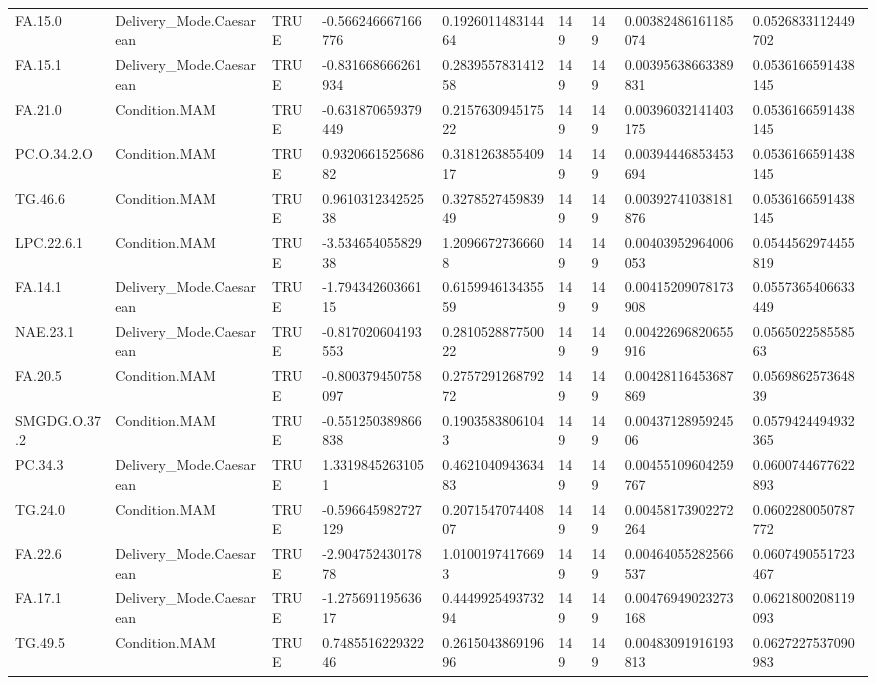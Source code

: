 \begin{longtable}{lllllllll}
FA.15.0 & Delivery\_Mode.Caesarean & TRUE & -0.566246667166776 & 0.192601148314464 & 149 & 149 & 0.00382486161185074 & 0.0526833112449702 \\
FA.15.1 & Delivery\_Mode.Caesarean & TRUE & -0.831668666261934 & 0.283955783141258 & 149 & 149 & 0.00395638663389831 & 0.0536166591438145 \\
FA.21.0 & Condition.MAM & TRUE & -0.631870659379449 & 0.215763094517522 & 149 & 149 & 0.00396032141403175 & 0.0536166591438145 \\
PC.O.34.2.O & Condition.MAM & TRUE & 0.932066152568682 & 0.318126385540917 & 149 & 149 & 0.00394446853453694 & 0.0536166591438145 \\
TG.46.6 & Condition.MAM & TRUE & 0.961031234252538 & 0.327852745983949 & 149 & 149 & 0.00392741038181876 & 0.0536166591438145 \\
LPC.22.6.1 & Condition.MAM & TRUE & -3.53465405582938 & 1.20966727366608 & 149 & 149 & 0.00403952964006053 & 0.0544562974455819 \\
FA.14.1 & Delivery\_Mode.Caesarean & TRUE & -1.79434260366115 & 0.615994613435559 & 149 & 149 & 0.00415209078173908 & 0.0557365406633449 \\
NAE.23.1 & Delivery\_Mode.Caesarean & TRUE & -0.817020604193553 & 0.281052887750022 & 149 & 149 & 0.00422696820655916 & 0.056502258558563 \\
FA.20.5 & Condition.MAM & TRUE & -0.800379450758097 & 0.275729126879272 & 149 & 149 & 0.00428116453687869 & 0.056986257364839 \\
SMGDG.O.37.2 & Condition.MAM & TRUE & -0.551250389866838 & 0.19035838061043 & 149 & 149 & 0.0043712895924506 & 0.0579424494932365 \\
PC.34.3 & Delivery\_Mode.Caesarean & TRUE & 1.33198452631051 & 0.462104094363483 & 149 & 149 & 0.00455109604259767 & 0.0600744677622893 \\
TG.24.0 & Condition.MAM & TRUE & -0.596645982727129 & 0.207154707440807 & 149 & 149 & 0.00458173902272264 & 0.0602280050787772 \\
FA.22.6 & Delivery\_Mode.Caesarean & TRUE & -2.90475243017878 & 1.01001974176693 & 149 & 149 & 0.00464055282566537 & 0.0607490551723467 \\
FA.17.1 & Delivery\_Mode.Caesarean & TRUE & -1.27569119563617 & 0.444992549373294 & 149 & 149 & 0.00476949023273168 & 0.0621800208119093 \\
TG.49.5 & Condition.MAM & TRUE & 0.748551622932246 & 0.261504386919696 & 149 & 149 & 0.00483091916193813 & 0.0627227537090983 \\

\end{longtable}
